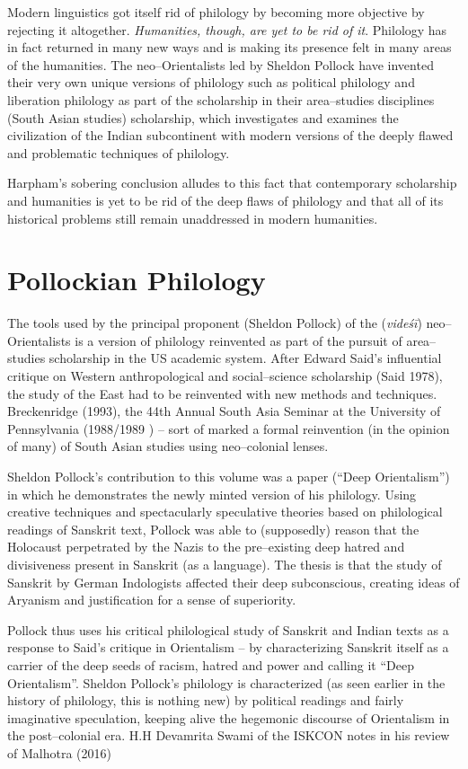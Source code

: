 Modern linguistics got itself rid of philology by becoming more objective by rejecting it altogether. \textit{Humanities, though, are yet to be rid of it}. Philology has in fact returned in many new ways and is making its presence felt in many areas of the humanities. The neo–Orientalists led by Sheldon Pollock have invented their very own unique versions of philology such as political philology and liberation philology as part of the scholarship in their area–studies disciplines (South Asian studies) scholarship, which investigates and examines the civilization of the Indian subcontinent with modern versions of the deeply flawed and problematic techniques of philology.

Harpham’s sobering conclusion alludes to this fact that contemporary scholarship and humanities is yet to be rid of the deep flaws of philology and that all of its historical problems still remain unaddressed in modern humanities.


\section*{Pollockian Philology}

The tools used by the principal proponent (Sheldon Pollock) of the (\textit{videśī}) neo–Orientalists is a version of philology reinvented as part of the pursuit of area–studies scholarship in the US academic system. After Edward Said’s influential critique on Western anthropological and social–science scholarship (Said 1978), the study of the East had to be reinvented with new methods and techniques. Breckenridge (1993), the 44th Annual South Asia Seminar at the University of Pennsylvania (1988/1989 ) – sort of marked a formal reinvention (in the opinion of many) of South Asian studies using neo–colonial lenses.

\newpage

Sheldon Pollock’s contribution to this volume was a paper (“Deep Orientalism”) in which he demonstrates the newly minted version of his philology. Using creative techniques and spectacularly speculative theories based on philological readings of Sanskrit text, Pollock was able to (supposedly) reason that the Holocaust perpetrated by the Nazis to the pre–existing deep hatred and divisiveness present in Sanskrit (as a language). The thesis is that the study of Sanskrit by German Indologists affected their deep subconscious, creating ideas of Aryanism and justification for a sense of superiority.

Pollock thus uses his critical philological study of Sanskrit and Indian texts as a response to Said’s critique in Orientalism – by characterizing Sanskrit itself as a carrier of the deep seeds of racism, hatred and power and calling it “Deep Orientalism”. Sheldon Pollock’s philology is characterized (as seen earlier in the history of philology, this is nothing new) by political readings and fairly imaginative speculation, keeping alive the hegemonic discourse of Orientalism in the post–colonial era. H.H Devamrita Swami of the ISKCON notes in his review of Malhotra (2016)

